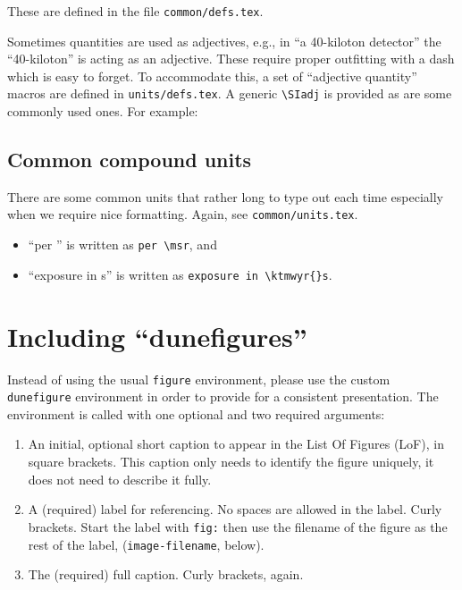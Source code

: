 These are defined in the file \texttt{common/defs.tex}.

Sometimes quantities are used as adjectives, e.g., in ``a 40-kiloton detector'' the ``40-kiloton'' is acting as an adjective.
These require proper outfitting with a dash which is easy to forget.
To accommodate this, a set of ``adjective quantity'' macros are defined in \texttt{units/defs.tex}.
A generic \verb|\SIadj| is provided as are some commonly used ones.
For example:


\subsection{Common compound units}

There are some common units that rather long to type out each time
especially when we require nice formatting. Again, see \texttt{common/units.tex}.

\begin{itemize}
\item ``per \msr'' is written as \verb|per \msr|, and
\item ``exposure in \ktmwyr{}s'' is written as \verb|exposure in \ktmwyr{}s|.
\end{itemize}


\section{Including ``dunefigures''}
\label{sec:latex-figures}

Instead of using the usual \texttt{figure} environment, please use the custom \texttt{dunefigure}
environment in order to provide for a consistent presentation.
The environment is called with one optional and two required
arguments:

\begin{enumerate}
\item An initial, optional short caption to appear in the List Of Figures (LoF), in square brackets. This caption only needs to
identify the figure uniquely, it does not need to describe it fully.
\item A (required) label for referencing. No spaces are allowed in the label. Curly brackets. Start the label with \texttt{fig:} then use the filename of the figure as the rest of the label, (\texttt{image-filename}, below). 
\item The (required) full caption. Curly brackets, again.
\end{enumerate}

